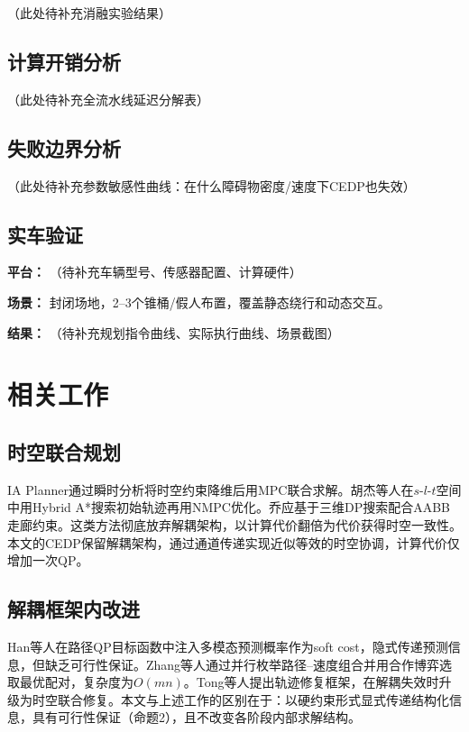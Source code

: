 \documentclass[a4paper,11pt]{article}
\begin{document}
（此处待补充消融实验结果）

\subsection{计算开销分析}

（此处待补充全流水线延迟分解表）

\subsection{失败边界分析}

（此处待补充参数敏感性曲线：在什么障碍物密度/速度下CEDP也失效）

\subsection{实车验证}

\textbf{平台：} （待补充车辆型号、传感器配置、计算硬件）

\textbf{场景：} 封闭场地，2--3个锥桶/假人布置，覆盖静态绕行和动态交互。

\textbf{结果：} （待补充规划指令曲线、实际执行曲线、场景截图）

\section{相关工作}

\subsection{时空联合规划}

IA Planner通过瞬时分析将时空约束降维后用MPC联合求解。胡杰等人在$s$-$l$-$t$空间中用Hybrid A*搜索初始轨迹再用NMPC优化。乔应基于三维DP搜索配合AABB走廊约束。这类方法彻底放弃解耦架构，以计算代价翻倍为代价获得时空一致性。本文的CEDP保留解耦架构，通过通道传递实现近似等效的时空协调，计算代价仅增加一次QP。

\subsection{解耦框架内改进}

Han等人在路径QP目标函数中注入多模态预测概率作为soft cost，隐式传递预测信息，但缺乏可行性保证。Zhang等人通过并行枚举路径--速度组合并用合作博弈选取最优配对，复杂度为$O(mn)$。Tong等人提出轨迹修复框架，在解耦失效时升级为时空联合修复。本文与上述工作的区别在于：以硬约束形式显式传递结构化信息，具有可行性保证（命题2），且不改变各阶段内部求解结构。
\end{document}
